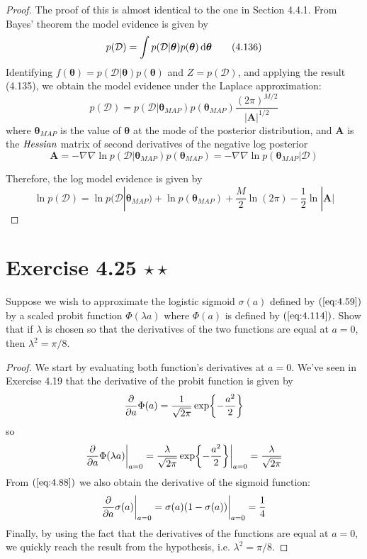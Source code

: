 \begin{proof}
    The proof of this is almost identical to the one in Section 4.4.1.
    From Bayes' theorem the model evidence is given by
    \begin{equation*}
        p(\mathcal{D}) 
        = \int p(\mathcal{D} | \bm{\theta}) p(\bm{\theta}) \mathop{}\!\mathrm{d} \bm{\theta}
        \tag{4.136}\label{eq:4.136}
    \end{equation*}
    Identifying $f(\bm{\theta}) = p(\mathcal{D} | \bm{\theta})p(\bm{\theta})$
    and $Z = p(\mathcal{D})$, and applying the result (4.135),
    we obtain the model evidence under the Laplace approximation:
    \[
        p(\mathcal{D}) 
        = p(\mathcal{D} | \bm{\theta}_{MAP})p(\bm{\theta}_{MAP}) 
        \frac{(2\pi)^{M/2}}{|\mathbf{A}|^{1/2}}
    \] 
    where $\bm{\theta}_{MAP}$ is the value of $\bm{\theta}$ at the mode
    of the posterior distribution, and $\mathbf{A}$ is the $\emph{Hessian}$ 
    matrix of second derivatives of the negative log posterior
    \begin{equation*}
        \mathbf{A} 
        = -\nabla \nabla \ln p(\mathcal{D} | \bm{\theta}_{MAP})p(\bm{\theta}_{MAP})
        = -\nabla \nabla \ln p(\bm{\theta}_{MAP} | \mathcal{D})
        \tag{4.138}\label{eq:4.138}
    \end{equation*}

    Therefore, the log model evidence is given by 
    \begin{equation*}
        \ln p(\mathcal{D}) 
        = \ln p(\mathcal{D} | \bm{\theta}_{MAP}) + \ln p(\bm{\theta}_{MAP})
        + \frac{M}{2} \ln (2\pi) - \frac{1}{2} \ln |\mathbf{A}|
        \tag{4.137}\label{eq:4.137}
    \end{equation*}
\end{proof}

\section*{Exercise 4.25 $\star \star$}
Suppose we wish to approximate the logistic sigmoid $\sigma(a)$ 
defined by $(\ref{eq:4.59})$ by a scaled probit function
$\Phi(\lambda a)$ where $\Phi(a)$ is defined by $(\ref{eq:4.114})$.
Show that if $\lambda$ is chosen so that the derivatives of the two
functions are equal at $a = 0$, then  $\lambda^2 = \pi/8$.

\vspace{1em}

\begin{proof}
    We start by evaluating both function's derivatives at $a=0$.
    We've seen in Exercise 4.19 that the derivative of the probit function
    is given by
     \[
         \pdv{a} \Phi(a) = \frac{1}{\sqrt{2\pi}} \exp{-\frac{a^2}{2}}
    \] 
    so
    \[
        \pdv{a} \Phi(\lambda a)\bigg|_{a=0}
        = \frac{\lambda}{\sqrt{2\pi}} \exp{-\frac{a^2}{2}}\bigg|_{a=0}
        = \frac{\lambda}{\sqrt{2\pi}}
    \] 
    From $(\ref{eq:4.88})$ we also obtain the derivative of the sigmoid function:
     \[
         \pdv{a} \sigma(a)\bigg|_{a=0} = \sigma(a)(1 - \sigma(a))\bigg|_{a = 0}
         = \frac{1}{4}
    \] 
    Finally, by using the fact that the derivatives of the functions are
    equal at $a=0$, we quickly reach the result from the hypothesis, 
    i.e. $\lambda^2 = \pi / 8$.
\end{proof}
